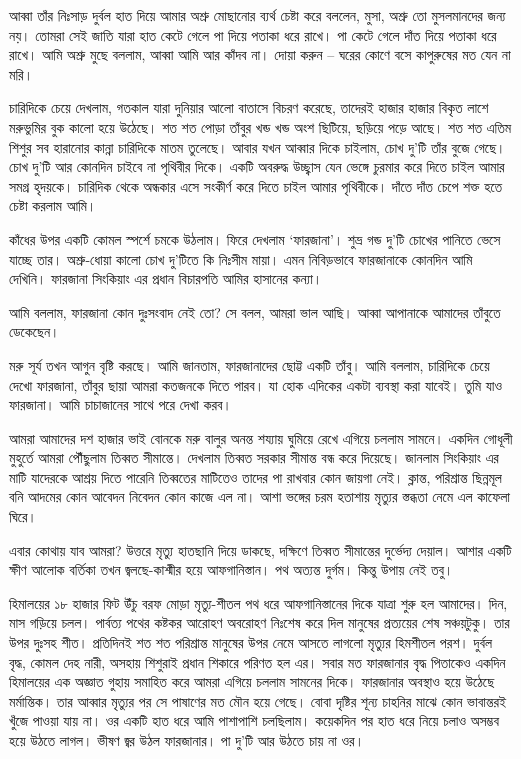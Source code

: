 \documentclass[
]{book}
\begin{document}
আব্বা তাঁর নিঃসাড় দুর্বল হাত দিয়ে আমার অশ্রু মোছানোর ব্যর্থ চেষ্টা করে বললেন, মুসা, অশ্রু তো মুসলমানদের জন্য নয়। তোমরা সেই জাতি যারা হাত কেটে গেলে পা দিয়ে পতাকা ধরে রাখে। পা কেটে গেলে দাঁত দিয়ে পতাকা ধরে রাখে। আমি অশ্রু মুছে বললাম, আব্বা আমি আর কাঁদব না। দোয়া করুন -- ঘরের কোণে বসে কাপুরুষের মত যেন না মরি।

চারিদিকে চেয়ে দেখলাম, গতকাল যারা দুনিয়ার আলো বাতাসে বিচরণ করেছে, তাদেরই হাজার হাজার বিকৃত লাশে মরুভুমির বুক কালো হয়ে উঠেছে। শত শত পোড়া তাঁবুর খন্ড খন্ড অংশ ছিটিয়ে, ছড়িয়ে পড়ে আছে। শত শত এতিম শিশুর সব হারানোর কান্না চারিদিকে মাতম তুলেছে। আবার যখন আব্বার দিকে চাইলাম, চোখ দু'টি তাঁর বুজে গেছে। চোখ দু'টি আর কোনদিন চাইবে না পৃথিবীর দিকে। একটি অবরুদ্ধ উচ্ছ্বাস যেন ভেঙ্গে চুরমার করে দিতে চাইল আমার সমগ্র হৃদয়কে। চারিদিক থেকে অন্ধকার এসে সংকীর্ণ করে দিতে চাইল আমার পৃথিবীকে। দাঁতে দাঁত চেপে শক্ত হতে চেষ্টা করলাম আমি।

কাঁধের উপর একটি কোমল স্পর্শে চমকে উঠলাম। ফিরে দেখলাম `ফারজানা'। শুভ্র গন্ড দু'টি চোখের পানিতে ভেসে যাচ্ছে তার। অশ্রু-ধোয়া কালো চোখ দু'টিতে কি নিঃসীম মায়া। এমন নিবিড়ভাবে ফারজানাকে কোনদিন আমি দেখিনি। ফারজানা সিংকিয়াং এর প্রধান বিচারপতি আমির হাসানের কন্যা।

আমি বললাম, ফারজানা কোন দুঃসংবাদ নেই তো? সে বলল, আমরা ভাল আছি। আব্বা আপানাকে আমাদের তাঁবুতে ডেকেছেন।

মরু সূর্য তখন আগুন বৃষ্টি করছে। আমি জানতাম, ফারজানাদের ছোট্ট একটি তাঁবু। আমি বললাম, চারিদিকে চেয়ে দেখো ফারজানা, তাঁবুর ছায়া আমরা কতজনকে দিতে পারব। যা হোক এদিকের একটা ব্যবস্থা করা যাবেই। তুমি যাও ফারজানা। আমি চাচাজানের সাথে পরে দেখা করব।

আমরা আমাদের দশ হাজার ভাই বোনকে মরু বালুর অনন্ত শয্যায় ঘুমিয়ে রেখে এগিয়ে চললাম সামনে। একদিন গোধূলী মুহুর্তে আমরা পৌঁছুলাম তিব্বত সীমান্তে। দেখলাম তিব্বত সরকার সীমান্ত বন্ধ করে দিয়েছে। জানলাম সিংকিয়াং এর মাটি যাদেরকে আশ্রয় দিতে পারেনি তিব্বতের মাটিতেও তাদের পা রাখবার কোন জায়গা নেই। ক্লান্ত, পরিশ্রান্ত ছিন্নমূল বনি আদমের কোন আবেদন নিবেদন কোন কাজে এল না। আশা ভঙ্গের চরম হতাশায় মৃত্যুর স্তব্ধতা নেমে এল কাফেলা ঘিরে।

এবার কোথায় যাব আমরা? উত্তরে মৃত্যু হাতছানি দিয়ে ডাকছে, দক্ষিণে তিব্বত সীমান্তের দুর্ভেদ্য দেয়াল। আশার একটি ক্ষীণ আলোক বর্তিকা তখন জ্বলছে-কাশ্মীর হয়ে আফগানিস্তান। পথ অত্যন্ত দুর্গম। কিন্তু উপায় নেই তবু।

হিমালয়ের ১৮ হাজার ফিট উঁচু বরফ মোড়া মৃত্যু-শীতল পথ ধরে আফগানিস্তানের দিকে যাত্রা শুরু হল আমাদের। দিন, মাস গড়িয়ে চলল। পার্বত্য পথের কষ্টকর আরোহণ অবরোহণ নিঃশেষ করে দিল মানুষের প্রত্যয়ের শেষ সঞ্চয়টুকু। তার উপর দুঃসহ শীত। প্রতিদিনই শত শত পরিশ্রান্ত মানুষের উপর নেমে আসতে লাগলো মৃত্যুর হিমশীতল পরশ। দুর্বল বৃদ্ধ, কোমল দেহ নারী, অসহায় শিশুরাই প্রধান শিকারে পরিণত হল এর। সবার মত ফারজানার বৃদ্ধ পিতাকেও একদিন হিমালয়ের এক অজ্ঞাত গুহায় সমাহিত করে আমরা এগিয়ে চললাম সামনের দিকে। ফারজানার অবস্থাও হয়ে উঠেছে মর্মান্তিক। তার আব্বার মৃত্যুর পর সে পাষাণের মত মৌন হয়ে গেছে। বোবা দৃষ্টির শূন্য চাহনির মাঝে কোন ভাবান্তরই খুঁজে পাওয়া যায় না। ওর একটি হাত ধরে আমি পাশাপাশি চলছিলাম। কয়েকদিন পর হাত ধরে নিয়ে চলাও অসম্ভব হয়ে উঠতে লাগল। ভীষণ জ্বর উঠল ফারজানার। পা দু'টি আর উঠতে চায় না ওর।
\end{document}
